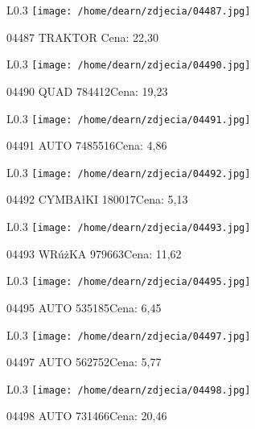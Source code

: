 \begin{wrapfigure}{L}{0.3\textwidth}
\texttt{[image: /home/dearn/zdjecia/04487.jpg]}
\end{wrapfigure}
04487 TRAKTOR Cena: 22,30\newline
\begin{wrapfigure}{L}{0.3\textwidth}
\texttt{[image: /home/dearn/zdjecia/04490.jpg]}
\end{wrapfigure}
04490 QUAD                                            784412Cena: 19,23\newline
\begin{wrapfigure}{L}{0.3\textwidth}
\texttt{[image: /home/dearn/zdjecia/04491.jpg]}
\end{wrapfigure}
04491 AUTO                                          7485516Cena: 4,86\newline
\begin{wrapfigure}{L}{0.3\textwidth}
\texttt{[image: /home/dearn/zdjecia/04492.jpg]}
\end{wrapfigure}
04492 CYMBAłKI                                       180017Cena: 5,13\newline
\begin{wrapfigure}{L}{0.3\textwidth}
\texttt{[image: /home/dearn/zdjecia/04493.jpg]}
\end{wrapfigure}
04493 WRúżKA                                          979663Cena: 11,62\newline
\begin{wrapfigure}{L}{0.3\textwidth}
\texttt{[image: /home/dearn/zdjecia/04495.jpg]}
\end{wrapfigure}
04495 AUTO                                           535185Cena: 6,45\newline
\begin{wrapfigure}{L}{0.3\textwidth}
\texttt{[image: /home/dearn/zdjecia/04497.jpg]}
\end{wrapfigure}
04497 AUTO                                            562752Cena: 5,77\newline
\begin{wrapfigure}{L}{0.3\textwidth}
\texttt{[image: /home/dearn/zdjecia/04498.jpg]}
\end{wrapfigure}
04498 AUTO                                            731466Cena: 20,46\newline
